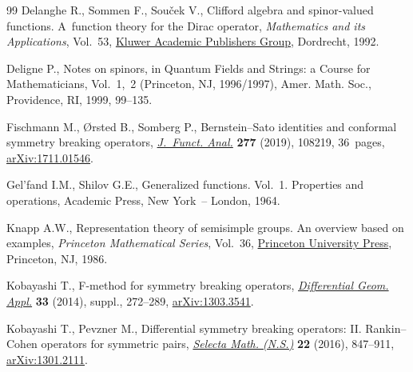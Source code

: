 \documentclass[10pt,a4paper]{amsart}
\numberwithin{equation}{section}
\begin{document}
\begin{thebibliography}{99}
Delanghe R., Sommen F., Sou\v{c}ek V., Clifford algebra and spinor-valued
 functions. A~function theory for the Dirac operator, \textit{Mathematics and
 its Applications}, Vol.~53, \href{https://doi.org/10.1007/978-94-011-2922-0}{Kluwer Academic Publishers Group}, Dordrecht,
 1992.

Deligne P., Notes on spinors, in Quantum Fields and Strings: a Course for
 Mathematicians, {V}ol.~1,~2 ({P}rinceton, {NJ}, 1996/1997), Amer. Math. Soc.,
 Providence, RI, 1999, 99--135.

Fischmann M., {\O}rsted B., Somberg P., Bernstein--{S}ato identities and
 conformal symmetry breaking operators, \href{https://doi.org/10.1016/j.jfa.2019.04.002}{\textit{J.~Funct. Anal.}} \textbf{277}
 (2019), 108219, 36~pages, \href{https://arxiv.org/abs/1711.01546}{arXiv:1711.01546}.

Gel'fand I.M., Shilov G.E., Generalized functions. {V}ol.~1. Properties and
 operations, Academic Press, New York~-- London, 1964.

Knapp A.W., Representation theory of semisimple groups. An overview based on
 examples, \textit{Princeton Mathematical Series}, Vol.~36, \href{https://doi.org/10.1515/9781400883974}{Princeton
 University Press}, Princeton, NJ, 1986.

Kobayashi T., F-method for symmetry breaking operators, \href{https://doi.org/10.1016/j.difgeo.2013.10.003}{\textit{Differential
 Geom. Appl.}} \textbf{33} (2014), suppl., 272--289, \href{https://arxiv.org/abs/1303.3541}{arXiv:1303.3541}.

Kobayashi T., Pevzner M., Differential symmetry breaking operators: {II}.
 {R}ankin--{C}ohen operators for symmetric pairs, \href{https://doi.org/10.1007/s00029-015-0208-8}{\textit{Selecta Math.
 (N.S.)}} \textbf{22} (2016), 847--911, \href{https://arxiv.org/abs/1301.2111}{arXiv:1301.2111}.

\end{thebibliography}
\end{document}
